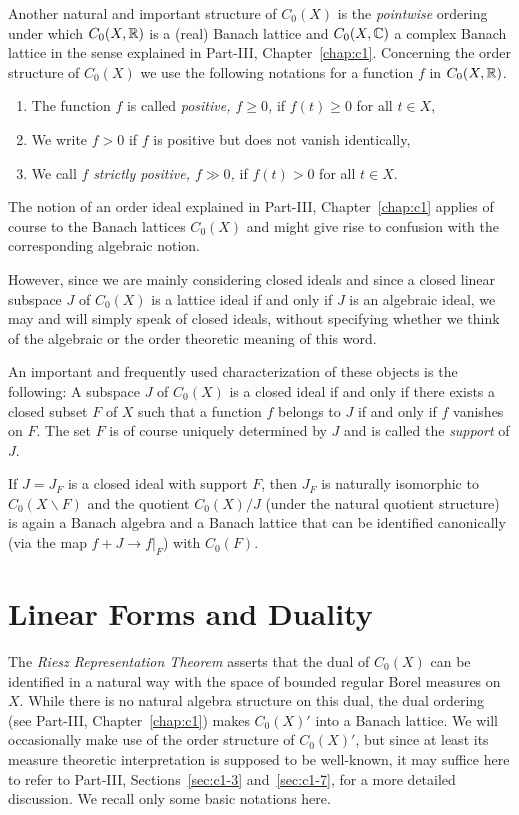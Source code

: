 Another natural and important structure of\/ $C_{0}(X)$ is the \emph{pointwise} ordering under which $C_{0}(X,\mathbb{R})$ is a (real) Banach lattice and $C_{0}(X,\mathbb{C})$ a complex Banach lattice in the sense explained in Part-III, Chapter~\ref{chap:c1}.
Concerning the order structure of\/ $C_{0}(X)$ we use the following notations for a function $f$ in $C_{0}(X,\mathbb{R})$.
\begin{enumerate}[\upshape (i), labelindent=.25em]
\item
The function $ f $ is called \emph{positive, $ f \geq 0 $,} if\/ $ f(t) \geq 0  $ for all $ t \in X $, 

\item
We write $f>0$ if\/ $ f $ is positive but does not vanish identically,

\item
We call $ f $ \emph{strictly positive, $f \gg 0$,}  if\/ $ f(t) > 0 $ for all $ t \in X $.

\end{enumerate}
The notion of an order ideal explained in Part-III, Chapter~\ref{chap:c1} applies of course to the Banach lattices $C_{0}(X)$ and might give rise to confusion with the corresponding algebraic notion.

However, since we are mainly considering closed ideals and since a closed linear subspace $J$ of\/ $C_{0}(X)$ is a lattice ideal if and only if\/ $J$ is an algebraic ideal, we may and will simply speak of closed ideals, without specifying whether we think of the algebraic or the order theoretic meaning of this word.

An important and frequently used characterization of these objects is the following: A subspace $J$ of\/ $C_{0}(X)$ is a closed ideal if and only if there exists a closed subset $F$ of\/ $X$ such that a function $f$ belongs to $J$ if and only if\/ $f$ vanishes on $F$.
The set $F$ is of course uniquely determined by $J$ and is called the \emph{support} of\/ $J$.

If\/ $J = J_{F}$ is a closed ideal with support $F$, then $J_{F}$ is naturally isomorphic to $C_{0}(X\backslash F)$ and the quotient $C_{0}(X)/J$ (under the natural quotient structure) is again a Banach algebra and a Banach lattice that can be identified canonically (via the map $f + J \to f\vert_{F}$) with $C_{0}(F)$.
\section{Linear Forms and Duality}\label{sec:b1-2}%
The \emph{Riesz Representation Theorem} asserts that the dual of\/ $C_{0}(X)$ can be identified in a natural way with the space of bounded regular Borel measures on $X$.
While there is no natural algebra structure on this dual, the dual ordering (see Part-III, Chapter~\ref{chap:c1}) makes $C_{0}(X)'$ into a Banach lattice.
We will occasionally make use of the order structure of\/ $C_{0}(X)'$, but since at least its measure theoretic interpretation is supposed to be well-known, it may suffice here to refer to Part-III,
Sections~\ref{sec:c1-3} and~\ref{sec:c1-7}, for a more detailed discussion.
We recall only some basic notations here.

